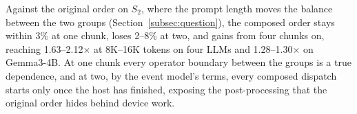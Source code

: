 \label{subsec:shape-eval}
Against the original order on $S_2$, where the prompt length moves the balance between the two groups (Section~\ref{subsec:question}), the composed order stays within 3\% at one chunk, loses 2--8\% at two, and gains from four chunks on, reaching 1.63--2.12$\times$ at 8K--16K tokens on four LLMs and 1.28--1.30$\times$ on Gemma3-4B.
At one chunk every operator boundary between the groups is a true dependence, and at two, by the event model's terms, every composed dispatch starts only once the host has finished, exposing the post-processing that the original order hides behind device work.

